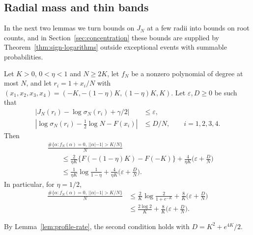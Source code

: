 \subsection{Radial mass and thin bands}\label{sec:radial-mass}
In the next two lemmas we turn bounds on $J_N$ at a few radii into bounds
on root counts, and in Section~\ref{sec:concentration} these bounds are
supplied by Theorem~\ref{thm:sign-logarithms} outside exceptional events
with summable probabilities.

\begin{lemma}\label{lem:annular-mass}
Let $K>0$, $0<\eta<1$ and $N\ge2K$, let $f_N$ be a nonzero polynomial of
degree at most $N$, and let $r_i=1+x_i/N$ with
$(x_1,x_2,x_3,x_4)=(-K,-(1-\eta)K,(1-\eta)K,K)$.
Let $\varepsilon,D\ge0$ be such that
\begin{align*}
 \left|J_N(r_i)-\log\sigma_N(r_i)+\gamma/2\right|&\le\varepsilon,\\
 \left|\log\sigma_N(r_i)-\tfrac12\log N-F(x_i)\right|&\le D/N,
 \qquad i=1,2,3,4.
\end{align*}
Then
\begin{align*}
 &\frac{\#\{\alpha:f_N(\alpha)=0,\ ||\alpha|-1|>K/N\}}N\\
 &\qquad\le\frac2{\eta K}\{F(-(1-\eta)K)-F(-K)\}
   +\frac4{\eta K}\Big(\varepsilon+\frac DN\Big)\\
 &\qquad\le\frac1{\eta K}\log\frac1{1-\eta}
   +\frac4{\eta K}\Big(\varepsilon+\frac DN\Big).
\end{align*}
In particular, for $\eta=1/2$,
\begin{align*}
 \frac{\#\{\alpha:f_N(\alpha)=0,\ ||\alpha|-1|>K/N\}}N
 &\le\frac2K\log\frac2{1+e^{-K}}+\frac8K\Big(\varepsilon+\frac DN\Big)\\
 &\le\frac{2\log2}K+\frac8K\Big(\varepsilon+\frac DN\Big).
\end{align*}
\end{lemma}

By Lemma~\ref{lem:profile-rate}, the second condition holds with
$D=K^2+e^{4K}/2$.

